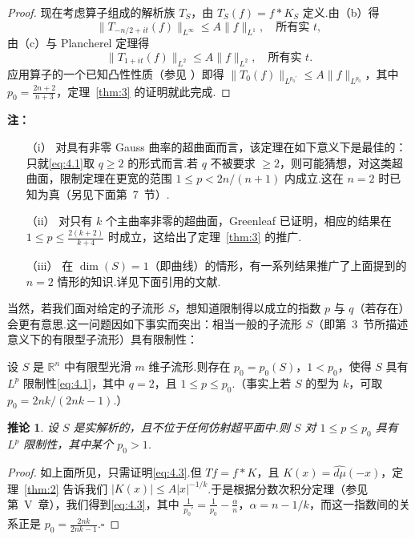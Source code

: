 \documentclass[
  BookTitleCN={傅里叶分析中的振动积分},
  BookTitleEN={Oscillatory Integrals in Fourier Analysis},
  OriginalAuthor={E.~M. Stein},
  OriginalEdition={Proc. Sympos. Pure Math. 35, Part~1},
  OriginalPublisher={American Mathematical Society},
  OriginalYear={1979},
  Translator={翻译及重排},
  ModelUsed={Codex CLI},
  Biblatex=false,
  TranslationDate={2026年8月27日}
]{mathtranslation}
\numberwithin{equation}{chapter}   %
\newtheorem*{corollary*}{推论}
\newcommand{\R}{\mathbb{R}}
\begin{document}
\begin{proof}
  现在考虑算子组成的解析族 $T_{S}$，由 $T_{S}(f)=f*K_{S}$ 定义.由（b）得
  \begin{equation}
    \|T_{-n/2+it}(f)\|_{L^{\infty}}\leq A\|f\|_{L^{1}},\quad\text{所有实 }t, \label{eq:4.5}
  \end{equation}
  由（c）与 Plancherel 定理得
  \begin{equation}
    \|T_{1+it}(f)\|_{L^{2}}\leq A\|f\|_{L^{2}},\quad\text{所有实 }t . \label{eq:4.6}
  \end{equation}
  应用算子的一个已知凸性性质（参见 \cite{ref28}）即得 $\|T_{0}(f)\|_{L^{p_{0}'}}\leq A\|f\|_{L^{p_{0}}}$，其中 $p_{0}=\frac{2n+2}{n+3}$，定理~\ref{thm:3} 的证明就此完成.
\end{proof}

\noindent\textbf{注：}
\begin{enumerate}
  \item[（i）] 对具有非零 Gauss 曲率的超曲面而言，该定理在如下意义下是最佳的：只就\eqref{eq:4.1}取 $q\geq2$ 的形式而言.若 $q$ 不被要求 $\geq2$，则可能猜想，对这类超曲面，限制定理在更宽的范围 $1\leq p<2n/(n+1)$ 内成立.这在 $n=2$ 时已知为真（另见下面第~7~节）.
  \item[（ii）] 对只有 $k$ 个主曲率非零的超曲面，Greenleaf \cite{ref12} 已证明，相应的结果在 $1\leq p\leq\frac{2(k+2)}{k+4}$ 时成立，这给出了定理~\ref{thm:3} 的推广.
  \item[（iii）] 在 $\dim(S)=1$（即曲线）的情形，有一系列结果推广了上面提到的 $n=2$ 情形的知识.详见下面引用的文献.
\end{enumerate}

\noindent 当然，若我们面对给定的子流形 $S$，想知道限制得以成立的指数 $p$ 与 $q$（若存在）会更有意思.这一问题因如下事实而突出：相当一般的子流形 $S$（即第~3~节所描述意义下的有限型子流形）具有限制性：

\begin{theorem}\label{thm:4}
  设 $S$ 是 $\R^{n}$ 中有限型光滑 $m$ 维子流形.则存在 $p_{0}=p_{0}(S)$，$1<p_{0}$，使得 $S$ 具有 $L^{p}$ 限制性\eqref{eq:4.1}，其中 $q=2$，且 $1\leq p\leq p_{0}$.（事实上若 $S$ 的型为 $k$，可取 $p_{0}=2nk/(2nk-1)$.）
\end{theorem}

\begin{corollary*}
  设 $S$ 是实解析的，且不位于任何仿射超平面中.则 $S$ 对 $1\leq p\leq p_{0}$ 具有 $L^{p}$ 限制性，其中某个 $p_{0}>1$.
\end{corollary*}

\begin{proof}
  如上面所见，只需证明\eqref{eq:4.3}.但 $Tf=f*K$，且 $K(x)=\widehat{d\mu}(-x)$，定理~\ref{thm:2} 告诉我们 $|K(x)|\leq A|x|^{-1/k}$.于是根据分数次积分定理（参见 \cite{ref26} 第~V~章），我们得到\eqref{eq:4.3}，其中 $\frac{1}{p_{0}'}=\frac{1}{p_{0}}-\frac{\alpha}{n}$，$\alpha=n-1/k$，而这一指数间的关系正是 $p_{0}=\frac{2nk}{2nk-1}$.$\square$
\end{proof}
\end{document}
